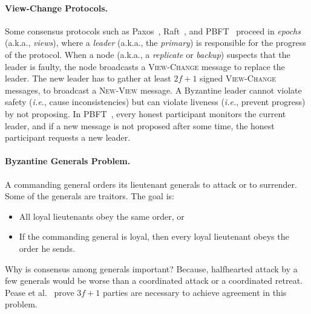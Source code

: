 \documentclass[11pt]{article}
\newcommand{\ie}{\textit{i.e.}}
\theoremstyle{mytheoremstyle}
\begin{document}
\paragraph{View-Change Protocols.} Some consensus protocols such as Paxos~\cite{lamport:1998:Paxos}, Raft~\cite{raft:2014}, and PBFT~\cite{pbft:99} proceed in \emph{epochs} (a.k.a., \emph{views}), where a \emph{leader} (a.k.a., the \emph{primary}) is responsible for the progress of the protocol. When a node (a.k.a., a \emph{replicate} or \emph{backup}) suspects that the leader is faulty, the node broadcasts a \textsc{View-Change} message to replace the leader. The new leader has to gather at least $2f+1$ signed \textsc{View-Change} messages, to broadcast a \textsc{New-View} message. A Byzantine leader cannot violate safety (\ie, cause inconsistencies) but can violate liveness (\ie, prevent progress) by not proposing. In PBFT~\cite{pbft:99}, every honest participant monitors the current leader, and if a new message is not proposed after some time, the honest participant requests a new leader.

\paragraph{Byzantine Generals Problem.} A commanding general orders its lieutenant generals to attack or to surrender. Some of the generals are traitors. The goal is:
\begin{itemize}
	\item All loyal lieutenants obey the same order, or
	\item If the commanding general is loyal, then every loyal lieutenant obeys the order he sends.
\end{itemize}

Why is consensus among generals important? Because, halfhearted attack by a few generals would be worse than a coordinated attack or a coordinated retreat. Pease et al.~\cite{pease80reaching} prove $3f+1$ parties are necessary to achieve agreement in this problem.


\end{document}
